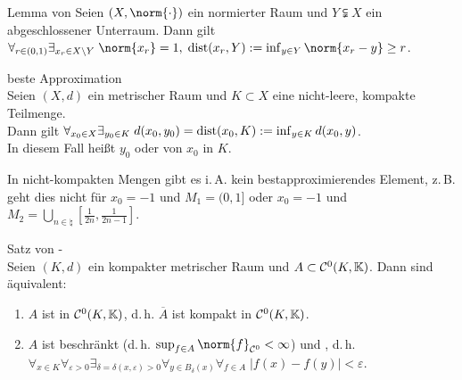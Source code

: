 
\begin{Lemma}{Lemma von }
    Seien $(X, \norm{\cdot})$ ein normierter Raum und
    $Y \subsetneqq X$ ein abgeschlossener Unterraum.
    Dann gilt $\forall_{r \in (0,1)} \exists_{x_r \in X \setminus Y}\;
    \norm{x_r} = 1,\; \dist(x_r, Y) := \inf_{y \in Y} \norm{x_r - y} \ge r$.
\end{Lemma}

\linie

\begin{Satz}{beste Approximation}\\
    Seien $(X, d)$ ein metrischer Raum und $K \subset X$ eine nicht-leere, kompakte Teilmenge.\\
    Dann gilt $\forall_{x_0 \in X} \exists_{y_0 \in K}\; d(x_0, y_0) = \operatorname{dist}(x_0, K)
    := \inf_{y \in K} d(x_0, y)$.\\
    In diesem Fall heißt $y_0$  oder
     von $x_0$ in $K$.
\end{Satz}

\begin{Bem}
    In nicht-kompakten Mengen gibt es i.\,A. kein bestapproximierendes Element,
    z.\,B. geht dies nicht für $x_0 = -1$ und $M_1 = (0, 1]$ oder
    $x_0 = -1$ und $M_2 = \bigcup_{n \in \natural} \left[\frac{1}{2n}, \frac{1}{2n-1}\right]$.
\end{Bem}

\linie

\begin{Satz}{Satz von -}\\
    Seien $(K, d)$ ein kompakter metrischer Raum und $A \subset \mathcal{C}^0(K, \mathbb{K})$.
    Dann sind äquivalent:
    \begin{enumerate}
        \item
        $A$ ist  in $\mathcal{C}^0(K, \mathbb{K})$, d.\,h.
        $\overline{A}$ ist kompakt in $\mathcal{C}^0(K, \mathbb{K})$.

        \item
        $A$ ist beschränkt (d.\,h. $\sup_{f \in A} \norm{f}_{\C^0} < \infty$)
        und , d.\,h.
        \\$\forall_{x \in K} \forall_{\varepsilon > 0}
        \exists_{\delta = \delta(x, \varepsilon) > 0}
        \forall_{y \in B_\delta(x)} \forall_{f \in A}\; |f(x) - f(y)| < \varepsilon$.
    \end{enumerate}
\end{Satz}


